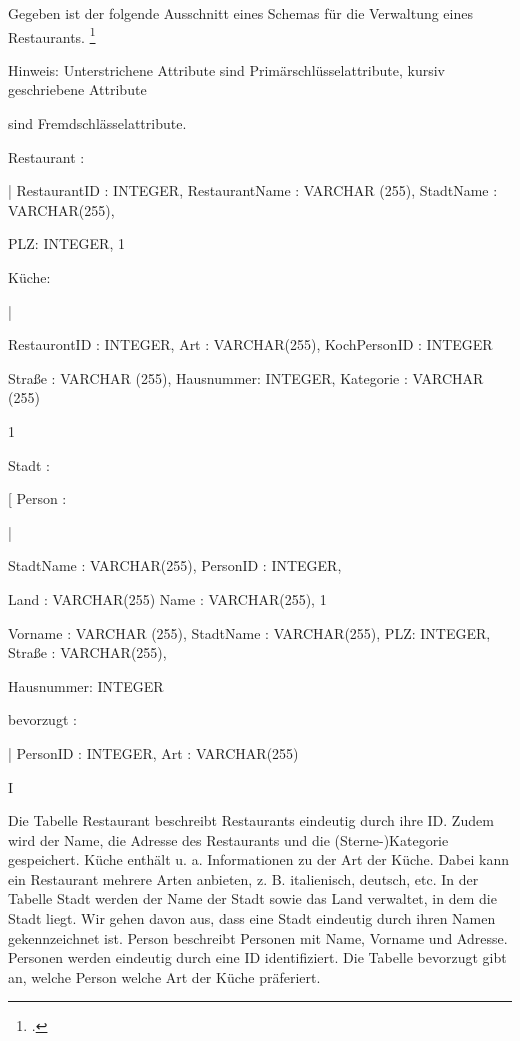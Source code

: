 \documentclass{bschlangaul-aufgabe}
\begin{document}

Gegeben ist der folgende Ausschnitt eines Schemas für die Verwaltung
eines Restaurants.
\footcite{examen:66116:2020:09}

Hinweis: Unterstrichene Attribute sind Primärschlüsselattribute, kursiv
geschriebene Attribute

sind Fremdschlässelattribute.

Restaurant : {|
RestaurantID : INTEGER,
RestaurantName : VARCHAR (255),
StadtName : VARCHAR(255),

PLZ: INTEGER, 1}

Küche: {|

RestaurontID : INTEGER,
Art : VARCHAR(255),
KochPersonID : INTEGER

Straße : VARCHAR (255),
Hausnummer: INTEGER,
Kategorie : VARCHAR (255)

1}

Stadt : {[ Person : {|

StadtName : VARCHAR(255), PersonID : INTEGER,

Land : VARCHAR(255) Name : VARCHAR(255),
1} Vorname : VARCHAR (255),
StadtName : VARCHAR(255),
PLZ: INTEGER,
Straße : VARCHAR(255),

Hausnummer: INTEGER

bevorzugt : {|
PersonID : INTEGER,
Art : VARCHAR(255)

} I}

Die Tabelle Restaurant beschreibt Restaurants eindeutig durch ihre ID.
Zudem wird der Name, die Adresse des Restaurants und die
(Sterne-)Kategorie gespeichert. Küche enthält u. a. Informationen zu der
Art der Küche. Dabei kann ein Restaurant mehrere Arten anbieten, z. B.
italienisch, deutsch, etc. In der Tabelle Stadt werden der Name der
Stadt sowie das Land verwaltet, in dem die Stadt liegt. Wir gehen davon
aus, dass eine Stadt eindeutig durch ihren Namen gekennzeichnet ist.
Person beschreibt Personen mit Name, Vorname und Adresse. Personen
werden eindeutig durch eine ID identifiziert. Die Tabelle bevorzugt gibt
an, welche Person welche Art der Küche präferiert.
\end{document}
